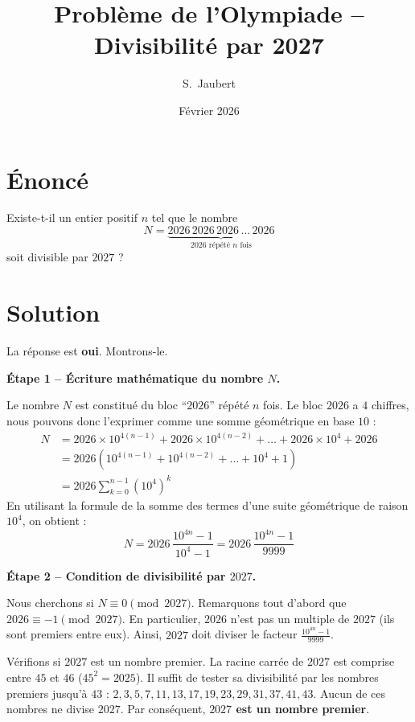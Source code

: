 \documentclass[a4paper,12pt]{article}
\title{Probl\`eme de l'Olympiade -- Divisibilit\'e par 2027}
\author{S.\ Jaubert}
\date{F\'evrier 2026}
\begin{document}
\maketitle

\section*{\'Enonc\'e}

Existe-t-il un entier positif $n$ tel que le nombre
\[
  N = \underbrace{2026\,2026\,2026\,\dots\,2026}_{2026 \text{ r\'ep\'et\'e } n \text{ fois}}
\]
soit divisible par $2027$ ?

\section*{Solution}

La r\'eponse est \textbf{oui}. Montrons-le.

\bigskip

\textbf{\'Etape 1 -- \'Ecriture math\'ematique du nombre $N$.}

Le nombre $N$ est constitu\'e du bloc ``$2026$'' r\'ep\'et\'e $n$ fois. Le bloc $2026$ a $4$ chiffres, nous pouvons donc l'exprimer comme une somme g\'eom\'etrique en base $10$ :
\begin{align*}
N &= 2026 \times 10^{4(n-1)} + 2026 \times 10^{4(n-2)} + \dots + 2026 \times 10^{4} + 2026 \\
  &= 2026 \left( 10^{4(n-1)} + 10^{4(n-2)} + \dots + 10^4 + 1 \right) \\
  &= 2026 \sum_{k=0}^{n-1} \left(10^4\right)^k
\end{align*}
En utilisant la formule de la somme des termes d'une suite g\'eom\'etrique de raison $10^4$, on obtient :
\[
  N = 2026 \, \frac{10^{4n} - 1}{10^4 - 1} = 2026 \, \frac{10^{4n} - 1}{9999}
\]

\bigskip

\textbf{\'Etape 2 -- Condition de divisibilit\'e par $2027$.}

Nous cherchons si $N \equiv 0 \pmod{2027}$.
Remarquons tout d'abord que $2026 \equiv -1 \pmod{2027}$. En particulier, $2026$ n'est pas un multiple de $2027$ (ils sont premiers entre eux).
Ainsi, $2027$ doit diviser le facteur $\frac{10^{4n} - 1}{9999}$.

V\'erifions si $2027$ est un nombre premier. La racine carr\'ee de $2027$ est comprise entre $45$ et $46$ ($45^2 = 2025$). Il suffit de tester sa divisibilit\'e par les nombres premiers jusqu'\`a $43$ :
$2, 3, 5, 7, 11, 13, 17, 19, 23, 29, 31, 37, 41, 43$.
Aucun de ces nombres ne divise $2027$. Par cons\'equent, \textbf{$2027$ est un nombre premier}.
\end{document}
